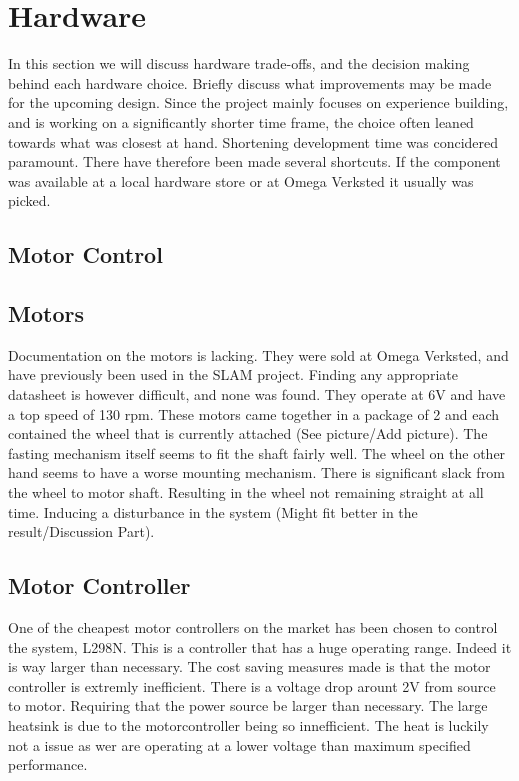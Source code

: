 \section{Hardware}

In this section we will discuss hardware trade-offs, and the decision making behind each hardware choice. Briefly discuss what 
improvements may be made for the upcoming design. Since the project mainly focuses on experience building, and is working on a 
significantly shorter time frame, the choice often leaned  towards what was closest at hand. Shortening development time was concidered
paramount. There have therefore been made several shortcuts. If the component was available at a local hardware store or at Omega Verksted
it usually was picked. 


\subsection{Motor Control}

\subsection{Motors}
Documentation on the motors is lacking. They were sold at Omega Verksted, and have previously been used in the SLAM project. Finding any appropriate
datasheet is however difficult, and none was found. They operate at 6V and have a top speed of 130 rpm. These motors came together in a package of 2
and each contained the wheel that is currently attached (See picture/Add picture). The fasting mechanism itself seems to fit the shaft fairly well.
The wheel on the other hand seems to have a worse mounting mechanism. There is significant slack from the wheel to motor shaft. Resulting in the 
wheel not remaining straight at all time. Inducing a disturbance in the system (Might fit better in the result/Discussion Part).

\subsection{Motor Controller}
One of the cheapest motor controllers on the market has been chosen to control the system, L298N. This is a controller that has a huge operating
range. Indeed it is way larger than necessary. The cost saving measures made is that the motor controller is extremly inefficient. There is a
voltage drop arount 2V from source to motor. Requiring that the power source be larger than necessary. The large heatsink is due to the motorcontroller
being so innefficient. The heat is luckily not a issue as wer are operating at a lower voltage than maximum specified performance.

